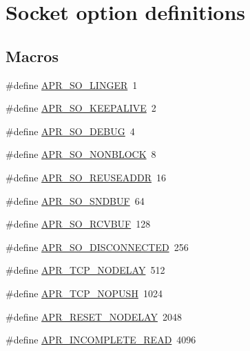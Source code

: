 \hypertarget{group__apr__sockopt}{}\section{Socket option definitions}
\label{group__apr__sockopt}
\subsection*{Macros}
\begin{DoxyCompactItemize}
\item 
\#define \hyperlink{group__apr__sockopt_ga6a807e7b78937ab74a4fcd6e99d76669}{A\+P\+R\+\_\+\+S\+O\+\_\+\+L\+I\+N\+G\+ER}~1
\item 
\#define \hyperlink{group__apr__sockopt_ga0c54c5b98593d9ad2f8cc8836da7eae5}{A\+P\+R\+\_\+\+S\+O\+\_\+\+K\+E\+E\+P\+A\+L\+I\+VE}~2
\item 
\#define \hyperlink{group__apr__sockopt_ga2b30d26f69059692e97a59ec1d6db73b}{A\+P\+R\+\_\+\+S\+O\+\_\+\+D\+E\+B\+UG}~4
\item 
\#define \hyperlink{group__apr__sockopt_gac3bf19cc28b43da9b9dc396c84914a0f}{A\+P\+R\+\_\+\+S\+O\+\_\+\+N\+O\+N\+B\+L\+O\+CK}~8
\item 
\#define \hyperlink{group__apr__sockopt_ga90434074950efa1383d7c5649026a159}{A\+P\+R\+\_\+\+S\+O\+\_\+\+R\+E\+U\+S\+E\+A\+D\+DR}~16
\item 
\#define \hyperlink{group__apr__sockopt_ga0e7ef8d3785eec5210ede9fd309db35f}{A\+P\+R\+\_\+\+S\+O\+\_\+\+S\+N\+D\+B\+UF}~64
\item 
\#define \hyperlink{group__apr__sockopt_ga4ab9494893075c8db6ac26a997f41f0e}{A\+P\+R\+\_\+\+S\+O\+\_\+\+R\+C\+V\+B\+UF}~128
\item 
\#define \hyperlink{group__apr__sockopt_ga5fd72839e254ddec03ffb624c21fa564}{A\+P\+R\+\_\+\+S\+O\+\_\+\+D\+I\+S\+C\+O\+N\+N\+E\+C\+T\+ED}~256
\item 
\#define \hyperlink{group__apr__sockopt_ga24db924d850dea792e92be7f8bc45cbd}{A\+P\+R\+\_\+\+T\+C\+P\+\_\+\+N\+O\+D\+E\+L\+AY}~512
\item 
\#define \hyperlink{group__apr__sockopt_ga7679a9e3114815eb6c31d26db707975d}{A\+P\+R\+\_\+\+T\+C\+P\+\_\+\+N\+O\+P\+U\+SH}~1024
\item 
\#define \hyperlink{group__apr__sockopt_gac9ee12e841eefaf86fabaae4a298adea}{A\+P\+R\+\_\+\+R\+E\+S\+E\+T\+\_\+\+N\+O\+D\+E\+L\+AY}~2048
\item 
\#define \hyperlink{group__apr__sockopt_ga73b6c80791c5148c2a416e03a8a1ff8a}{A\+P\+R\+\_\+\+I\+N\+C\+O\+M\+P\+L\+E\+T\+E\+\_\+\+R\+E\+AD}~4096

\end{DoxyCompactItemize}
